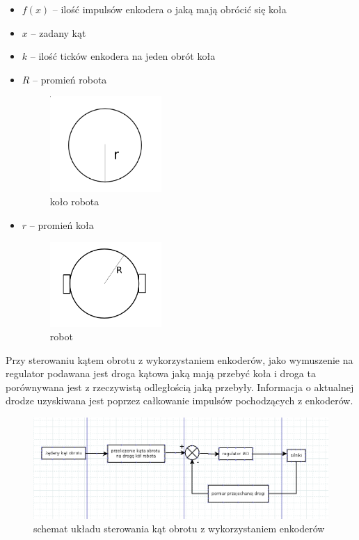 \documentclass[12pt,a4paper,twoside,openright,fleqn]{mwrep}
\begin{document}
\begin{itemize}
    \item $f(x)$ -- ilość impulsów enkodera o jaką mają obrócić się koła 
    \item $x$ -- zadany kąt 
    \item $k$ -- ilość ticków enkodera na jeden obrót koła
    \item $R$ -- promień robota
        \begin{figure}[h]
        \centering
        \includegraphics[width=0.4\textwidth]{./images/wheel_r}
        \caption{koło robota}
        \label{wheel_r}
        \end{figure}
    \item $r$ -- promień koła
        \begin{figure}[h]
        \centering
        \includegraphics[width=0.4\textwidth]{./images/robot_r}
        \caption{robot}
        \label{robot_r}
        \end{figure}
\end{itemize}


Przy sterowaniu kątem obrotu z wykorzystaniem enkoderów, jako wymuszenie na regulator podawana jest droga kątowa jaką mają przebyć koła i droga ta porównywana jest z rzeczywistą odległością jaką przebyły. Informacja o aktualnej drodze uzyskiwana jest poprzez całkowanie impulsów pochodzących z enkoderów. 

\begin{figure}[h]
\centering
\includegraphics[width=1.0\textwidth]{./images/enkoder_uklad_sterowania}
\caption{schemat układu sterowania kąt obrotu z wykorzystaniem enkoderów}
\label{enkoder_uklad_sterowania}
\end{figure}
\end{document}
